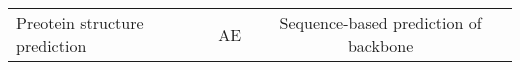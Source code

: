\begin{center}
\begin{tabular}{l c c}
    Preotein structure prediction & AE & Sequence-based prediction of backbone 
\end{tabular}
\end{center}